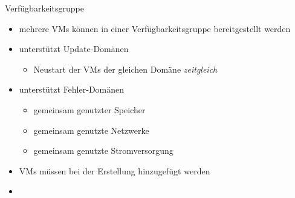 \begin{flashcard}[]{Verfügbarkeitsgruppe}
  \begin{itemize}
    \item mehrere VMs können in einer Verfügbarkeitsgruppe bereitgestellt werden
    \item unterstützt Update-Domänen
      \begin{itemize}
        \item Neustart der VMs der gleichen Domäne \emph{zeitgleich}
      \end{itemize}
    \item unterstützt Fehler-Domänen
      \begin{itemize}
         \item gemeinsam genutzter Speicher
         \item gemeinsam genutzte Netzwerke
         \item gemeinsam genutzte Stromversorgung
      \end{itemize}
    \item[!] VMs müssen bei der Erstellung hinzugefügt werden
  \end{itemize}
\end{flashcard}

\begin{flashcard}[]{}
  \begin{itemize}
    \item 
  \end{itemize}
\end{flashcard}

